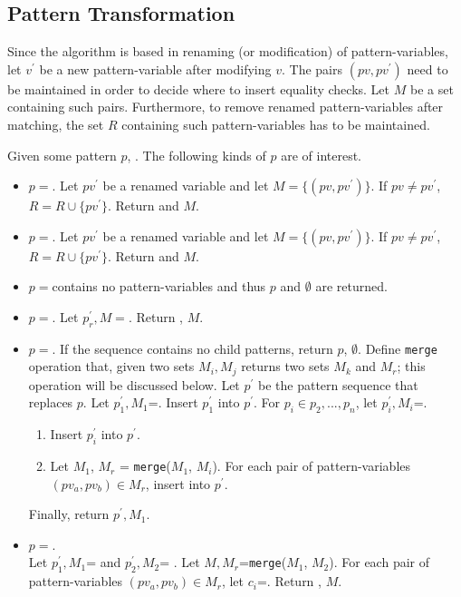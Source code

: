 \subsection{Pattern Transformation}
Since the algorithm is based in renaming (or modification) of pattern-variables, let $v^{\prime}$ be a new pattern-variable after modifying $v$. The pairs $(pv, pv^{\prime})$ need to be maintained in order to decide where to insert equality checks. Let $M$ be a set containing such pairs. Furthermore, to remove renamed pattern-variables after matching, the set $R$ containing such pattern-variables has to be maintained.

Given some pattern $p$, . The following kinds of $p$ are of interest.
\begin{itemize}
\item $p=$\BuiltInPattern. Let $pv^{\prime}$ be a renamed variable and let $M=\{(pv, pv^{\prime})\}$. If $pv \neq pv^{\prime}$, $R=R \cup \{pv^{\prime}\}$. Return \BuiltInPattern[$tag$][$pv^{\prime}$][false] and $M$.
\item $p=$\NonTerminal. Let $pv^{\prime}$ be a renamed variable and let $M=\{(pv, pv^{\prime})\}$. If $pv \neq pv^{\prime}$, $R=R \cup \{pv^{\prime}\}$. Return \NonTerminal[$nt$][$pv^{\prime}$][false] and $M$.
\item $p=$\LiteralPattern contains no pattern-variables and thus $p$ and $\emptyset$ are returned.
\item $p=$\PatternRepeat. Let $p_r^{\prime}, M =$. Return \PatternRepeat[$p_r^{\prime}$], $M$.
\item
$p=$\PatternSequence. If the sequence contains no child patterns, return $p$, $\emptyset$. Define \texttt{merge} operation that, given two sets $M_i, M_j$ returns two sets $M_k$ and $M_r$; this operation will be discussed below.
Let $p^{\prime}$ be the pattern sequence that replaces $p$.
Let $p_1^{\prime}, M_1$=. Insert $p_1^{\prime}$ into $p^{\prime}$. For $p_i \in p_2, ..., p_n$, let $p_i^{\prime}, M_i$=.
	\begin{enumerate}
	\item
	Insert $p_i^{\prime}$ into $p^{\prime}$.
	\item
	Let $M_1$, $M_r$ = \texttt{merge}($M_1$, $M_i$). For each pair of pattern-variables $(pv_a, pv_b) \in M_r$, insert \PatternCheckConstraint[$pv_a$][$pv_b$][false] into $p^{\prime}$.
	\end{enumerate}
Finally, return $p^{\prime}, M_1$.

\item
$p=$\PatternInHole.\\ Let $p_1^{\prime}, M_1$=  and $p_2^{\prime}, M_2$= . Let $M, M_r$=\texttt{merge}($M_1$, $M_2$). For each pair of pattern-variables $(pv_a, pv_b) \in M_r$, let $c_i$=\PatternCheckConstraint[$pv_a$][$pv_b$][false]. Return \PatternInHole[$p_1^{\prime}$][$p_2^{\prime}$][$c_1$][$c_n$][false], $M$.
\end{itemize}


